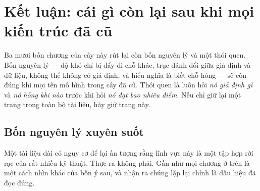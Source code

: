\documentclass[deep_learning.tex]{subfiles}
\begin{document}
\chapter*{Kết luận: cái gì còn lại sau khi mọi kiến trúc đã cũ}

\begin{tomtat}
Ba mươi bốn chương của cây này rút lại còn bốn nguyên lý và một thói quen. Bốn nguyên lý --- độ khó chỉ bị đẩy đi chỗ khác, trục đánh đổi giữa giả định và dữ liệu, không thể không có giả định, và hiểu nghĩa là biết chỗ hỏng --- sẽ còn đúng khi mọi tên mô hình trong cây đã cũ. Thói quen là luôn hỏi \emph{nó giả định gì} và \emph{nó hỏng khi nào} trước khi hỏi \emph{nó đạt bao nhiêu điểm}. Nếu chỉ giữ lại một trang trong toàn bộ tài liệu, hãy giữ trang này.
\end{tomtat}

\section{Bốn nguyên lý xuyên suốt}

Một tài liệu dài có nguy cơ để lại ấn tượng rằng lĩnh vực này là một tập hợp rời rạc của rất nhiều kỹ thuật. Thực ra không phải. Gần như mọi chương ở trên là một cách nhìn khác của bốn ý sau, và nhận ra chúng lặp lại chính là dấu hiệu đã đọc đúng.
\end{document}
